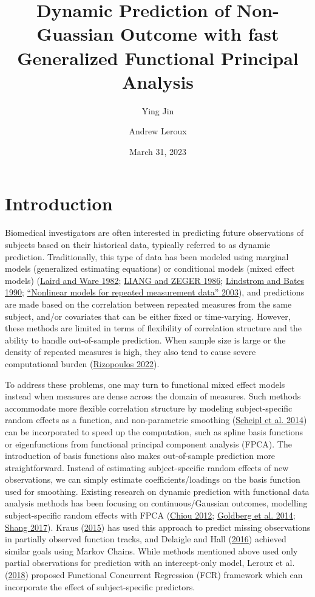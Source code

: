 \documentclass[
  11pt,
]{article}
\title{Dynamic Prediction of Non-Guassian Outcome with fast Generalized
Functional Principal Analysis}
\author{Ying Jin \and Andrew Leroux}
\date{March 31, 2023}
\begin{document}
\maketitle

\hypertarget{introduction}{%
\section{Introduction}\label{introduction}}

Biomedical investigators are often interested in predicting future
observations of subjects based on their historical data, typically
referred to as dynamic prediction. Traditionally, this type of data has
been modeled using marginal models (generalized estimating equations) or
conditional models (mixed effect models)
(\protect\hyperlink{ref-Laird1982}{Laird and Ware 1982};
\protect\hyperlink{ref-liang1986}{LIANG and ZEGER 1986};
\protect\hyperlink{ref-lindstrom1990}{Lindstrom and Bates 1990};
\protect\hyperlink{ref-davidian2003}{{``Nonlinear models for repeated
measurement data''} 2003}), and predictions are made based on the
correlation between repeated measures from the same subject, and/or
covariates that can be either fixed or time-varying. However, these
methods are limited in terms of flexibility of correlation structure and
the ability to handle out-of-sample prediction. When sample size is
large or the density of repeated measures is high, they also tend to
cause severe computational burden
(\protect\hyperlink{ref-GLMMadaptive}{Rizopoulos 2022}).

To address these problems, one may turn to functional mixed effect
models instead when measures are dense across the domain of measures.
Such methods accommodate more flexible correlation structure by modeling
subject-specific random effects as a function, and non-parametric
smoothing (\protect\hyperlink{ref-Scheipl2014}{Scheipl et al. 2014}) can
be incorporated to speed up the computation, such as spline basis
functions or eigenfunctions from functional principal component analysis
(FPCA). The introduction of basis functions also makes out-of-sample
prediction more straightforward. Instead of estimating subject-specific
random effects of new observations, we can simply estimate
coefficients/loadings on the basis function used for smoothing. Existing
research on dynamic prediction with functional data analysis methods has
been focusing on continuous/Gaussian outcomes, modelling
subject-specific random effects with FPCA
(\protect\hyperlink{ref-chiou2012}{Chiou 2012};
\protect\hyperlink{ref-goldberg2014}{Goldberg et al. 2014};
\protect\hyperlink{ref-shang2017}{Shang 2017}). Kraus
(\protect\hyperlink{ref-kraus2015}{2015}) has used this approach to
predict missing observations in partially observed function tracks, and
Delaigle and Hall (\protect\hyperlink{ref-delaigo2016}{2016}) achieved
similar goals using Markov Chains. While methods mentioned above used
only partial observations for prediction with an intercept-only model,
Leroux et al. (\protect\hyperlink{ref-leroux2016}{2018}) proposed
Functional Concurrent Regression (FCR) framework which can incorporate
the effect of subject-specific predictors.
\end{document}

